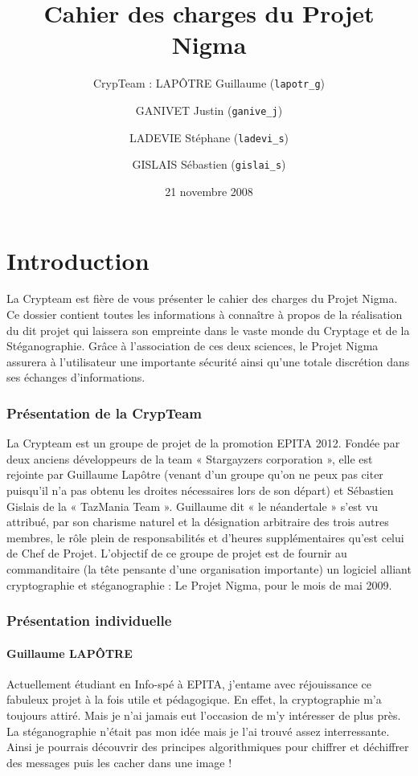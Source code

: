 \documentclass[a4paper,12pt]{article}
\title{Cahier des charges du Projet Nigma}
\author{CrypTeam : LAPÔTRE Guillaume (\texttt{lapotr\_g}) \and GANIVET Justin (\texttt{ganive\_j}) \and LADEVIE Stéphane (\texttt{ladevi\_s}) \and GISLAIS Sébastien (\texttt{gislai\_s})}
\date{21 novembre 2008}
\begin{document}
\maketitle{}
\newpage
\tableofcontents
\newpage
\part{Introduction}

La Crypteam est fière de vous présenter le cahier des charges du Projet Nigma. Ce dossier contient toutes les informations à connaître à propos de la réalisation du dit projet qui laissera son empreinte dans le vaste monde du Cryptage et de la Stéganographie. Grâce à l’association de ces deux sciences, le Projet Nigma assurera à l’utilisateur une importante sécurité ainsi qu’une totale discrétion dans ses échanges d’informations. 

\section {Présentation de la CrypTeam}

La Crypteam est un groupe de projet de la promotion EPITA 2012. Fondée par deux anciens développeurs de la team « Stargayzers corporation », elle est rejointe par Guillaume Lapôtre (venant d’un groupe qu’on ne peux pas citer puisqu’il n’a pas obtenu les droites nécessaires lors de son départ) et Sébastien Gislais de la « TazMania Team ». Guillaume dit « le néandertale » s’est vu attribué, par son charisme naturel et la désignation arbitraire des trois autres membres, le rôle plein de responsabilités et d’heures supplémentaires qu’est celui de Chef de Projet.
L’objectif de ce groupe de projet est de fournir au commanditaire (la tête pensante d’une organisation importante) un logiciel alliant cryptographie et stéganographie : Le Projet Nigma, pour le mois de mai 2009. 


\section {Présentation individuelle}

\subsection{Guillaume LAPÔTRE}

Actuellement étudiant en Info-spé à EPITA, j'entame avec réjouissance ce fabuleux projet à la fois utile et pédagogique. En effet, la cryptographie m'a toujours attiré. Mais je n'ai jamais eut l'occasion de m'y intéresser de plus près. La stéganographie n'était pas mon idée mais je l'ai trouvé assez interressante. Ainsi je pourrais découvrir des principes algorithmiques pour chiffrer et déchiffrer des messages puis les cacher dans une image !
\end{document}
